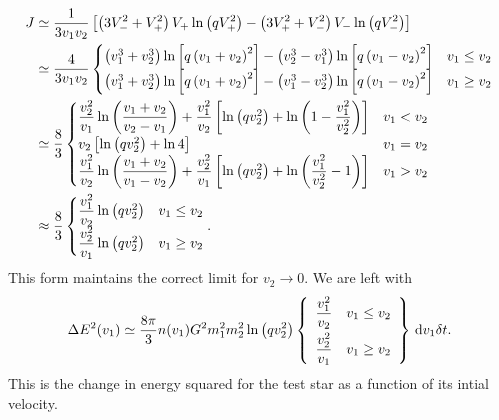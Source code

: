 \begin{align}
J \simeq {} & \dfrac{1}{3 v_1 v_2} \left[\left(3V_-^2 + V_+^2\right)V_+\ln\left(qV_+^2\right) - \left(3V_+^2 + V_-^2\right)V_-\ln\left(qV_-^2\right)\right] \\
 \simeq {} & \dfrac{4}{3v_1v_2}\begin{cases}
\left(v_1^3 + v_2^3\right)\ln\left[q\left(v_1 + v_2\right)^2\right] - \left(v_2^3 - v_1^3\right)\ln\left[q\left(v_1 - v_2\right)^2\right] & v_1 \leq v_2 \\
\left(v_1^3 + v_2^3\right)\ln\left[q\left(v_1 + v_2\right)^2\right] - \left(v_1^3 - v_2^3\right)\ln\left[q\left(v_1 - v_2\right)^2\right] & v_1 \geq v_2
\end{cases} \\
 \simeq {} & \dfrac{8}{3}\begin{cases}
\dfrac{v_2^2}{v_1}\ln\left(\dfrac{v_1 + v_2}{v_2 - v_1}\right) + \dfrac{v_1^2}{v_2}\left[\ln\left(qv_2^2\right) + \ln\left(1 - \dfrac{v_1^2}{v_2^2}\right)\right] & v_1 < v_2 \\
v_2\left[\ln\left(qv_2^2\right) + \ln 4\right] & v_1 = v_2\\
\dfrac{v_1^2}{v_2}\ln\left(\dfrac{v_1 + v_2}{v_1 - v_2}\right) + \dfrac{v_2^2}{v_1}\left[\ln\left(qv_2^2\right) + \ln\left(\dfrac{v_1^2}{v_2^2} - 1\right)\right] & v_1 > v_2
\end{cases} \\
\approx {} & \dfrac{8}{3}\begin{cases}
\dfrac{v_1^2}{v_2}\ln\left(qv_2^2\right) & v_1 \leq v_2 \\
\dfrac{v_2^2}{v_1}\ln\left(qv_2^2\right) & v_1 \geq v_2
\end{cases}.
\end{align}
This form maintains the correct limit for $v_2 \rightarrow 0$. We are left with
\begin{equation}
\Delta E^2(v_1) \simeq \dfrac{8\pi}{3} n(v_1)G^2m_1^2 m_2^2\ln\left(qv_2^2\right)\left\{\begin{array}{lr}\dfrac{v_1^2}{v_2}\vspace{1.0mm} & v_1 \leq v_2\\ \dfrac{v_2^2}{v_1} & v_1 \geq v_2 \end{array}\right\}\,\dd v_1\delta t.
\end{equation}
This is the change in energy squared for the test star as a function of its intial velocity.
